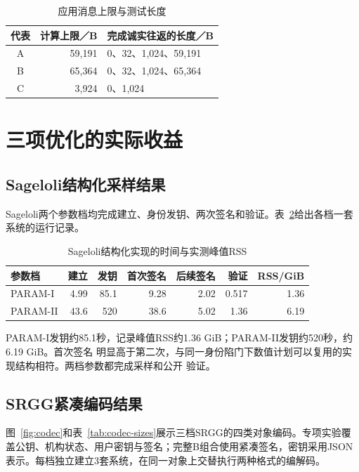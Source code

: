 \begin{table}[H]
\centering\small
\caption{应用消息上限与测试长度}
\label{tab:message-coverage}
\begin{tabular}{@{}crl@{}}
\toprule
\rowcolor{black!8} 代表 & 计算上限／B & 完成诚实往返的长度／B \\
\midrule
A & 59,191 & 0、32、1,024、59,191 \\
B & 65,364 & 0、32、1,024、65,364 \\
C & 3,924 & 0、1,024 \\
\bottomrule
\end{tabular}
\end{table}

\section{三项优化的实际收益}
\subsection{Sageloli结构化采样结果}
Sageloli两个参数档均完成建立、身份发钥、两次签名和验证。表~\ref{tab:sageloli-times}给出各档一套系统的运行记录。

\begin{table}[H]
\centering\small
\caption{Sageloli结构化实现的时间与实测峰值RSS}
\label{tab:sageloli-times}
\begin{tabular}{@{}lrrrrrr@{}}
\toprule
\rowcolor{black!8} 参数档 & 建立 & 发钥 & 首次签名 & 后续签名 & 验证 & RSS/GiB \\
\midrule
PARAM-I & 4.99 & 85.1 & 9.28 & 2.02 & 0.517 & 1.36 \\
PARAM-II & 43.6 & 520 & 38.6 & 5.02 & 1.36 & 6.19 \\
\bottomrule
\end{tabular}
\end{table}

PARAM-I发钥约85.1秒，记录峰值RSS约1.36 GiB；PARAM-II发钥约520秒，约6.19 GiB。首次签名
明显高于第二次，与同一身份陷门下数值计划可以复用的实现结构相符。两档参数都完成采样和公开
验证。

\Needspace{.45\textheight}
\subsection{SRGG紧凑编码结果}
图~\ref{fig:codec}和表~\ref{tab:codec-sizes}展示三档SRGG的四类对象编码。专项实验覆盖公钥、机构状态、用户密钥与签名；完整B组合使用紧凑签名，密钥采用JSON表示。每档独立建立3套系统，在同一对象上交替执行两种格式的编解码。

